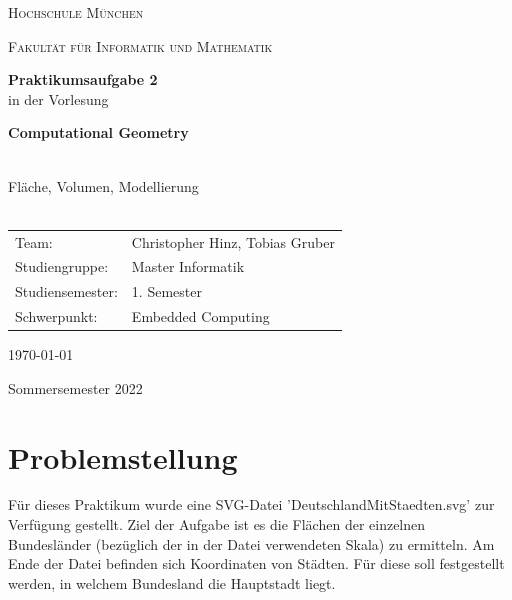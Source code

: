 \documentclass[12pt]{scrartcl}
\begin{document}
\begin{titlepage}
    \vfill
	\centering
    \vspace{1.5cm}

	{\scshape\LARGE Hochschule München \par}
    {\scshape\Large Fakultät für Informatik und Mathematik\par}
	\vspace{1.5cm}




    \vfill
    {\LARGE\bfseries Praktikumsaufgabe 2 \\}
    \vspace{0.5cm}
	{in der Vorlesung\\}
    \vspace{0.5cm}
    {\LARGE\bfseries Computational Geometry\\~\\ \par}
	{\LARGE Fläche, Volumen, Modellierung\\~\\ \par}
	\vfill
    \vfill


    \begin{tabular}{ll}
    \normalsize
    Team:  & Christopher Hinz, Tobias Gruber\\
    Studiengruppe: & Master Informatik\\
    Studiensemester: & 1. Semester\\
    Schwerpunkt: & Embedded Computing\\
    \end{tabular}
    \vspace{1.5cm}

    \today

    \vspace{0.5cm}

    Sommersemester 2022

	\vfill

\end{titlepage}

\newpage



\raggedright

\section{Problemstellung}
Für dieses Praktikum wurde eine SVG-Datei 'DeutschlandMitStaedten.svg' zur Verfügung gestellt. Ziel der Aufgabe ist es die Flächen der einzelnen Bundesländer (bezüglich der in der Datei verwendeten Skala) zu ermitteln.
Am Ende der Datei befinden sich Koordinaten von Städten. Für diese soll festgestellt werden, in welchem Bundesland die Hauptstadt liegt.
\end{document}

